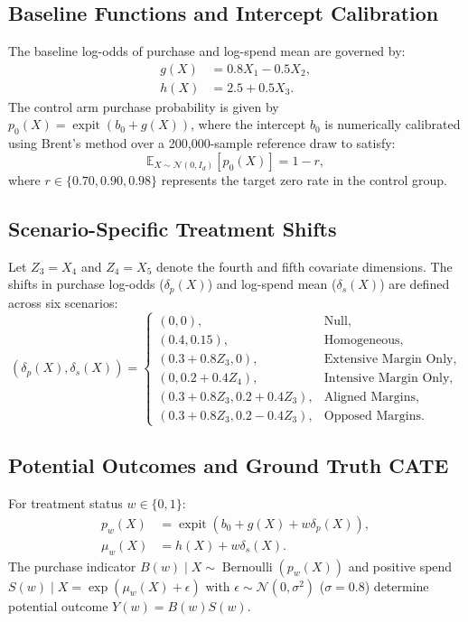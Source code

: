\documentclass[11pt,a4paper]{article}
\newcommand{\E}{\mathbb{E}}
\begin{document}
\subsection{Baseline Functions and Intercept Calibration}
The baseline log-odds of purchase and log-spend mean are governed by:
\begin{align}
g(X) &= 0.8 X_1 - 0.5 X_2, \\
h(X) &= 2.5 + 0.5 X_3.
\end{align}
The control arm purchase probability is given by $p_0(X) = \operatorname{expit}(b_0 + g(X))$, where the intercept $b_0$ is numerically calibrated using Brent's method over a 200,000-sample reference draw to satisfy:
\begin{equation}
\E_{X \sim \mathcal{N}(0, I_d)} [p_0(X)] = 1 - r,
\end{equation}
where $r \in \{0.70, 0.90, 0.98\}$ represents the target zero rate in the control group.

\subsection{Scenario-Specific Treatment Shifts}
Let $Z_3 = X_4$ and $Z_4 = X_5$ denote the fourth and fifth covariate dimensions. The shifts in purchase log-odds ($\delta_p(X)$) and log-spend mean ($\delta_s(X)$) are defined across six scenarios:
\begin{equation}
(\delta_p(X), \delta_s(X)) = \begin{cases}
(0, 0), & \text{Null}, \\
(0.4, 0.15), & \text{Homogeneous}, \\
(0.3 + 0.8 Z_3, 0), & \text{Extensive Margin Only}, \\
(0, 0.2 + 0.4 Z_4), & \text{Intensive Margin Only}, \\
(0.3 + 0.8 Z_3, 0.2 + 0.4 Z_3), & \text{Aligned Margins}, \\
(0.3 + 0.8 Z_3, 0.2 - 0.4 Z_3), & \text{Opposed Margins}.
\end{cases}
\end{equation}

\subsection{Potential Outcomes and Ground Truth CATE}
For treatment status $w \in \{0, 1\}$:
\begin{align}
p_w(X) &= \operatorname{expit}(b_0 + g(X) + w \delta_p(X)), \\
\mu_w(X) &= h(X) + w \delta_s(X).
\end{align}
The purchase indicator $B(w) \mid X \sim \operatorname{Bernoulli}(p_w(X))$ and positive spend $S(w) \mid X = \exp(\mu_w(X) + \epsilon)$ with $\epsilon \sim \mathcal{N}(0, \sigma^2)$ ($\sigma=0.8$) determine potential outcome $Y(w) = B(w) S(w)$.
\end{document}
